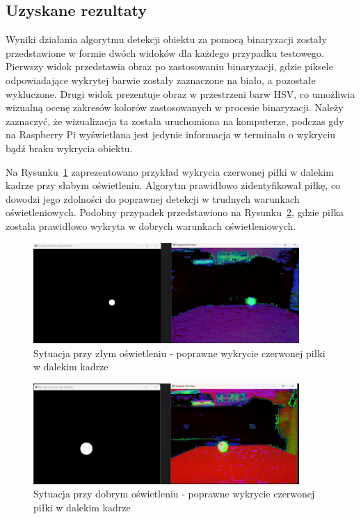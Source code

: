 \documentclass[a4paper,twoside,12pt]{book}
\begin{document}
\newpage
\subsection{Uzyskane rezultaty}
Wyniki działania algorytmu detekcji obiektu za pomocą binaryzacji zostały przedstawione w formie dwóch widoków dla każdego przypadku testowego. Pierwszy widok przedstawia obraz po zastosowaniu binaryzacji, gdzie piksele odpowiadające wykrytej barwie zostały zaznaczone na biało, a pozostałe wykluczone. Drugi widok prezentuje obraz w przestrzeni barw HSV, co umożliwia wizualną ocenę zakresów kolorów zastosowanych w procesie binaryzacji. Należy zaznaczyć, że wizualizacja ta została uruchomiona na komputerze, podczas gdy na Raspberry Pi wyświetlana jest jedynie informacja w terminalu o wykryciu bądź braku wykrycia obiektu.

Na Rysunku~\ref{fig:Wykrycie piłki6} zaprezentowano przykład wykrycia czerwonej piłki w dalekim kadrze przy słabym oświetleniu. Algorytm prawidłowo zidentyfikował piłkę, co dowodzi jego zdolności do poprawnej detekcji w trudnych warunkach oświetleniowych. Podobny przypadek przedstawiono na Rysunku~\ref{fig:Wykrycie piłki7}, gdzie piłka została prawidłowo wykryta w dobrych warunkach oświetleniowych.

\begin{figure}[h]
    \centering
    \includegraphics[width=0.9\textwidth]{Images/Porownanie/Binaryzacja/Zrzut ekranu 2025-01-02 193719.png}
    \caption{Sytuacja przy złym oświetleniu - poprawne wykrycie czerwonej piłki w dalekim kadrze}
    \label{fig:Wykrycie piłki6}
\end{figure}
\begin{figure}[h]
    \centering
    \includegraphics[width=0.9\textwidth]{Images/Porownanie/Binaryzacja/Zrzut ekranu 2025-01-02 193549.png}
    \caption{Sytuacja przy dobrym oświetleniu - poprawne wykrycie czerwonej piłki w dalekim kadrze}
    \label{fig:Wykrycie piłki7}
\end{figure}
\end{document}
